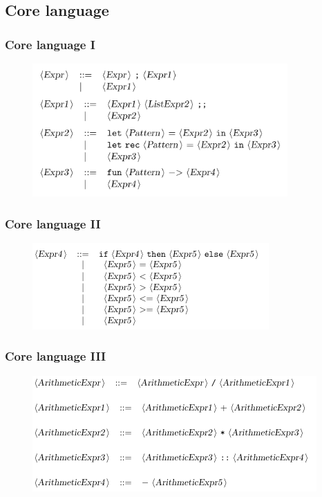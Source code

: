 \documentclass{beamer}
\begin{document}
  \subsection{Core language}
  \begin{frame}
    \frametitle{Core language I}
    \begin{figure}[ht]
      \begin{center}        
        \includegraphics[height=2in]{pipelinefigures/CoreLanguageSyntaxI.pdf}
      \end{center}      
    \end{figure}
  \end{frame}
  \begin{frame}
    \frametitle{Core language II}
    \begin{figure}[ht]
      \begin{center}        
        \includegraphics[width=\textwidth,height=0.8\textheight,keepaspectratio]{pipelinefigures/CoreLanguageSyntaxII.pdf}
      \end{center}      
    \end{figure}
  \end{frame}
  \begin{frame}
    \frametitle{Core language III}
    \begin{figure}[ht]
      \begin{center}        
        \includegraphics[width=\textwidth,height=0.8\textheight,keepaspectratio]{pipelinefigures/CoreLanguageSyntaxIII.pdf}
      \end{center}      
    \end{figure}
  \end{frame}
\end{document}
